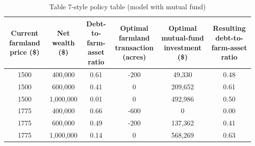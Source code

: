 \begin{table}
\caption{Table 7-style policy table (model with mutual fund)}
\label{tab:table7_mutual_makecell}
\begin{tabular}{cccccc}
\toprule
\makecell{Current farmland\\price (\$)} & \makecell{Net wealth\\(\$)} & \makecell{Debt-to-farm-asset\\ratio} & \makecell{Optimal farmland\\transaction (acres)} & \makecell{Optimal mutual-fund\\investment (\$)} & \makecell{Resulting debt-to-farm-asset\\ratio} \\
\midrule
1500 & 400,000 & 0.61 & -200 & 49,330 & 0.48 \\
1500 & 600,000 & 0.41 & 0 & 209,652 & 0.61 \\
1500 & 1,000,000 & 0.01 & 0 & 492,986 & 0.50 \\
1775 & 400,000 & 0.66 & -600 & 0 & 0.00 \\
1775 & 600,000 & 0.49 & -200 & 137,362 & 0.41 \\
1775 & 1,000,000 & 0.14 & 0 & 568,269 & 0.63 \\
\bottomrule
\end{tabular}
\end{table}
